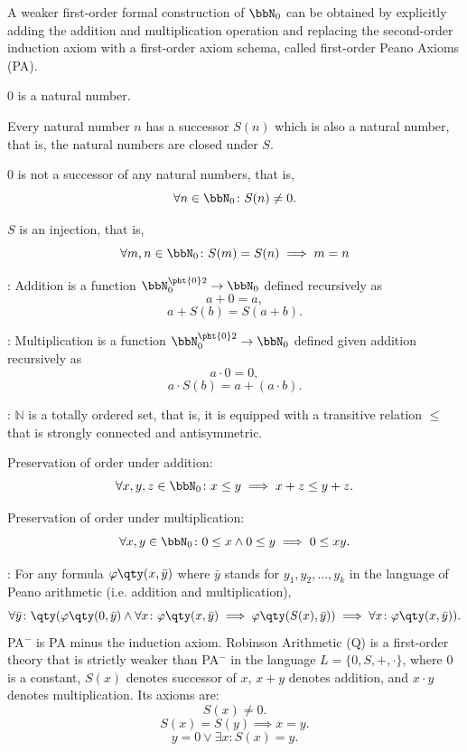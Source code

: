 \documentclass[a4paper,12pt]{article}
\begin{document}
A weaker first-order formal construction of $\bbN_0$ can be obtained by explicitly adding the addition and multiplication operation and replacing the second-order induction axiom with a first-order axiom schema, called first-order Peano Axioms (PA).
\bit
\item $0$ is a natural number.
\item Every natural number $n$ has a successor $S(n)$ which is also a natural number, that is, the natural numbers are closed under $S$.
\item $0$ is not a successor of any natural numbers, that is,
\[\forall n\in\bbN_0\colon S(n)\neq 0.\]
\item $S$ is an injection, that is,
\[\forall m,n\in\bbN_0\colon S(m)=S(n)\implies m=n\]
\item {}: Addition is a function $\bbN_0^{\pht{0}2}\to\bbN_0$ defined recursively as
\[a+0=a,\]
\[a+S(b)=S(a+b).\]
\item {}: Multiplication is a function $\bbN_0^{\pht{0}2}\to\bbN_0$ defined given addition recursively as
\[a\cdot 0=0,\]
\[a\cdot S(b)=a+(a\cdot b).\]
\item {}: $\mathbb{N}$ is a totally ordered set, that is, it is equipped with a transitive relation $\leq$ that is strongly connected and antisymmetric.
\bit
\item Preservation of order under addition:
\[\forall x,y,z\in\bbN_0\colon x\leq y\implies x+z\leq y+z.\]
\item Preservation of order under multiplication:
\[\forall x,y\in\bbN_0\colon 0\leq x\land 0\leq y\implies 0\leq xy.\]
\eit
\item {}: For any formula $\varphi\qty(x,\bar{y})$ where $\bar{y}$ stands for $y_1,y_2,\ldots,y_k$ in the language of Peano arithmetic (i.e. addition and multiplication),
\[\forall\bar{y}\colon\qty(\varphi\qty(0,\bar{y})\land\forall x\colon\varphi\qty(x,\bar{y})\implies\varphi\qty(S(x),\bar{y}))\implies\forall x\colon\varphi\qty(x,\bar{y})).\]
\eit
{}
PA$^-$ is PA minus the induction axiom.
Robinson Arithmetic (Q) is a first-order theory that is strictly weaker than PA$^-$ in the language $L=\{0,S,+,\cdot\}$, where $0$ is a constant, $S(x)$ denotes successor of $x$, $x+y$ denotes addition, and $x\cdot y$ denotes multiplication. Its axioms are:
\[S(x)\neq 0.\]
\[S(x)=S(y)\implies x=y.\]
\[y=0\lor\exists x\colon S(x)=y.\]
\end{document}
